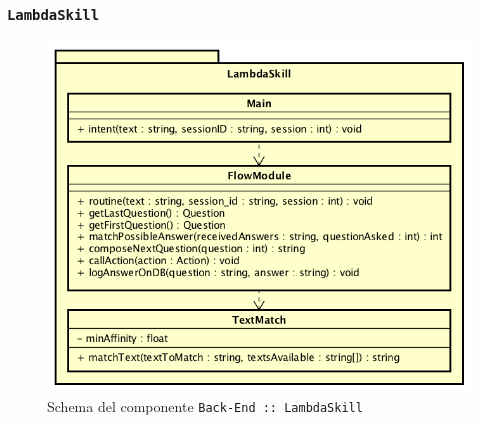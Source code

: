 \documentclass[../DefinizioneDiProdotto.tex]{subfiles}
\begin{document}
	\newpage
	\subsubsection{ \texttt{LambdaSkill}}
	\begin{figure}[!h]
		\centering
		\includegraphics[scale=0.7]{Architettura/Back-End/LambdaSkill.png}
		\caption{Schema del componente \texttt{Back-End :: LambdaSkill}}
	\end{figure}
\end{document}

